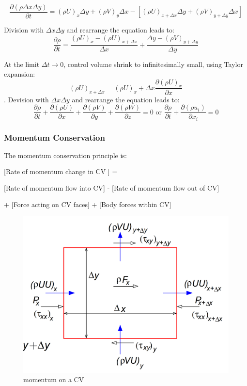 \documentclass{article}
\begin{document}
\begin{equation}
\frac{\partial (\rho\Delta x \Delta y)}{\partial t}  = (\rho U)_x \Delta y + (\rho V)_y \Delta x - \left[(\rho U)_{x+\Delta x} \Delta y + (\rho V)_{y + \Delta y} \Delta x \right]
\label{eq:mass conservation 1} 
\end{equation}

Division with $\Delta x \Delta y$ and rearrange the equation leads to:
\begin{equation}
\frac{\partial \rho}{\partial t}  = \frac{(\rho U)_x - (\rho U)_{x+\Delta x}}{\Delta x} + \frac{\Delta y - (\rho V)_{y + \Delta y}}{\Delta y} 
\label{mass conservation} 
\end{equation}

At the limit $\Delta t \rightarrow 0$, control volume shrink to infinitesimally small, using Taylor expansion: 
$$(\rho U)_{x + \Delta x} = (\rho U)_x + \Delta x \frac{\partial (\rho U)_x}{\partial x}$$. 
Devision with $\Delta x \Delta y$ and rearrange the equation leads to:
\begin{equation}
\frac{\partial \rho}{\partial t} + \frac{\partial (\rho U)}{\partial x} + \frac{\partial (\rho V)}{\partial y} + \frac{\partial (\rho W)}{\partial z} = 0 \text{ or } \frac{\partial \rho}{\partial t} + \frac{\partial (\rho u_i)}{\partial x_i} = 0
\label{eq: mass conservation 2} 
\end{equation}

\subsubsection{Momentum Conservation}

The momentum conservation principle is:
 
[Rate of momentum change in CV ] = 

[Rate of momentum flow into CV] - [Rate of momentum flow out of CV] 

+ [Force acting on CV faces] + [Body forces within CV]

\begin{figure}[h!]
\centering
\includegraphics[scale=0.15]{ns 2D momentum sketch.PNG}
\caption{momentum on a CV}
\label{fig:ns 2D momentum sketch.PNG}
\end{figure}
\end{document}
